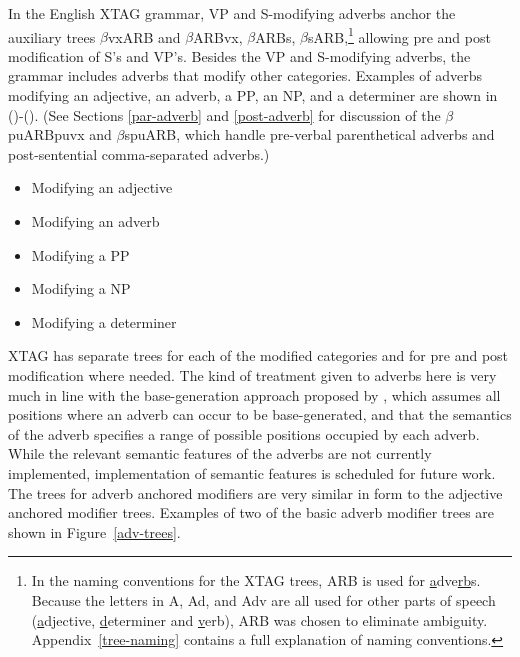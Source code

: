 In the English XTAG grammar, VP and S-modifying adverbs anchor the
auxiliary trees $\beta$vxARB and $\beta$ARBvx, $\beta$ARBs,
$\beta$sARB,\footnote{In the naming conventions for the XTAG trees,
ARB is used for {\underline a}dve{\underline {rb}}s.  Because the
letters in A, Ad, and Adv are all used for other parts of speech
({\underline a}djective, {\underline d}eterminer and {\underline
v}erb), ARB was chosen to eliminate ambiguity.
Appendix~\ref{tree-naming} contains a full explanation of naming
conventions.}  allowing pre and post modification of S's and VP's.
Besides the VP and S-modifying adverbs, the grammar includes adverbs
that modify other categories. Examples of adverbs modifying an
adjective, an adverb, a PP, an NP, and a determiner are shown in
()-(). (See Sections \ref{par-adverb} and
\ref{post-adverb} for discussion of the $\beta$puARBpuvx and
$\beta$spuARB, which handle pre-verbal parenthetical adverbs and
post-sentential comma-separated adverbs.)

\begin{itemize}
\item{Modifying an adjective}

\item{Modifying an adverb}

\item{Modifying a PP}

\item{Modifying a NP}

\item{Modifying a determiner}

\end{itemize}

XTAG has separate trees for each of the modified categories and for pre and
post modification where needed.  The kind of treatment given to adverbs here is
very much in line with the base-generation approach proposed by \cite{Ernst84},
which assumes all positions where an adverb can occur to be base-generated, and
that the semantics of the adverb specifies a range of possible positions
occupied by each adverb. While the relevant semantic features of the adverbs
are not currently implemented, implementation of semantic features is scheduled
for future work.  The trees for adverb anchored modifiers are very similar in
form to the adjective anchored modifier trees.  Examples of two of the basic
adverb modifier trees are shown in Figure~\ref{adv-trees}.

